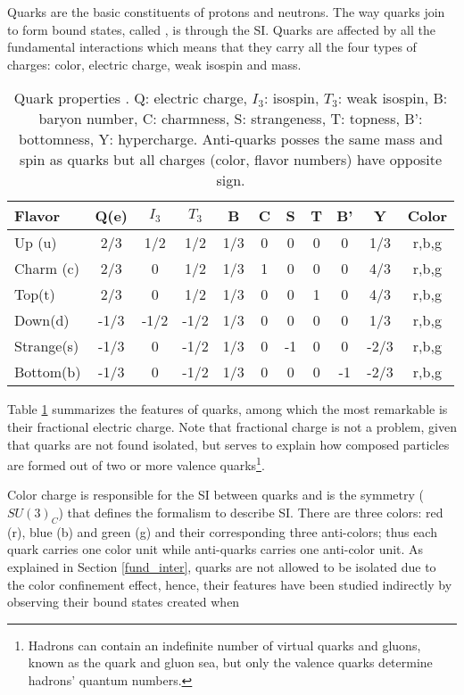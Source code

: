 Quarks are the basic constituents of protons and neutrons. The way quarks join to form bound states, called , is through the SI. Quarks are affected by all the fundamental interactions which means that they carry all the four types of charges: color, electric charge, weak isospin and mass.

\begin{center}
\begin{table}[h!]
\centering
\footnotesize
\begin{tabular}{lcccccccccc} \hline
Flavor     & Q(e) & $I_3$ & $T_3$  & B   & C & S  & T & B'  & Y    & Color \\ \hline
Up (u)     & 2/3  & 1/2   &  1/2   & 1/3 & 0 & 0  & 0 & 0   & 1/3  & r,b,g \\ %
Charm (c)  & 2/3  & 0     &  1/2   & 1/3 & 1 & 0  & 0 & 0   & 4/3  & r,b,g \\ %
Top(t)     & 2/3  & 0     &  1/2   & 1/3 & 0 & 0  & 1 & 0   & 4/3  & r,b,g \\ \hline
Down(d)    & -1/3 & -1/2  & -1/2   & 1/3 & 0 & 0  & 0 & 0   & 1/3  & r,b,g \\ %
Strange(s) & -1/3 & 0     & -1/2   & 1/3 & 0 & -1 & 0 & 0   & -2/3 & r,b,g \\ %
Bottom(b)  & -1/3 & 0     & -1/2   & 1/3 & 0 & 0  & 0 & -1  & -2/3 & r,b,g \\ \hline
\end{tabular}
\caption[Quark properties.]{Quark properties \cite{pdg}. Q: electric charge, $I_3$: isospin, $T_3$: weak isospin, B: baryon number, C: charmness, S: strangeness, T: topness, B': bottomness, Y: hypercharge. Anti-quarks posses the same mass and spin as quarks but all charges (color, flavor numbers) have opposite sign.}\label{quarks}
\end{table}
\end{center}

Table \ref{quarks} summarizes the features of quarks, among which the most remarkable is their fractional electric charge. Note that fractional charge is not a problem, given that quarks are not found isolated, but serves to explain how composed particles are formed out of two or more valence quarks\footnote{Hadrons can contain an indefinite number of virtual quarks and gluons, known as the quark and gluon sea, but only the valence quarks determine hadrons' quantum numbers.}.

Color charge is responsible for the SI between quarks and is the symmetry ($SU(3)_C$) that defines the formalism to describe SI. There are three colors: red (r), blue (b) and green (g) and their corresponding three anti-colors; thus each quark carries one color unit while anti-quarks carries one anti-color unit. As explained in Section \ref{fund_inter}, quarks are not allowed to be isolated due to the color confinement effect, hence, their features have been studied indirectly by observing their bound states created when


